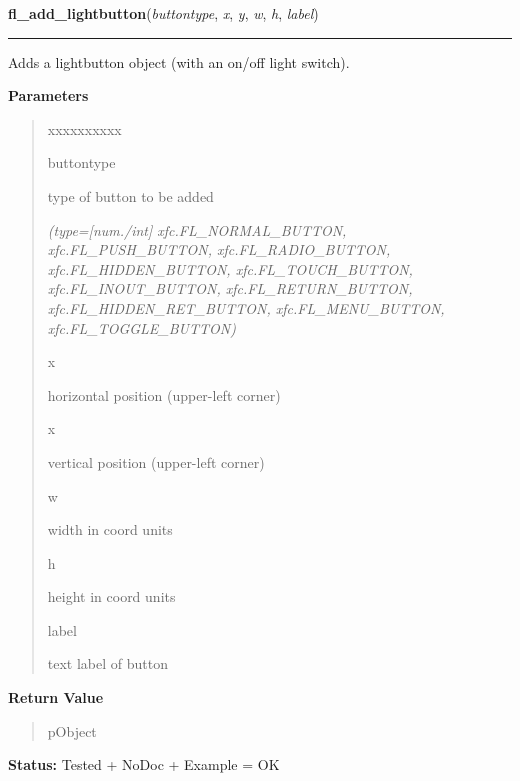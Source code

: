 \hspace{.8\funcindent}\begin{boxedminipage}{\funcwidth}

    \raggedright \textbf{fl\_add\_lightbutton}(\textit{buttontype}, \textit{x}, \textit{y}, \textit{w}, \textit{h}, \textit{label})

    \vspace{-1.5ex}

    \rule{\textwidth}{0.5\fboxrule}
\setlength{\parskip}{2ex}
    Adds a lightbutton object (with an on/off light switch).

\setlength{\parskip}{1ex}
      \textbf{Parameters}
      \vspace{-1ex}

      \begin{quote}
        \begin{Ventry}{xxxxxxxxxx}

          \item[buttontype]

          type of button to be added

            {\it (type=[num./int] xfc.FL\_NORMAL\_BUTTON, xfc.FL\_PUSH\_BUTTON, 
xfc.FL\_RADIO\_BUTTON, xfc.FL\_HIDDEN\_BUTTON, xfc.FL\_TOUCH\_BUTTON, 
xfc.FL\_INOUT\_BUTTON, xfc.FL\_RETURN\_BUTTON, xfc.FL\_HIDDEN\_RET\_BUTTON,
xfc.FL\_MENU\_BUTTON, xfc.FL\_TOGGLE\_BUTTON)}

          \item[x]

          horizontal position (upper-left corner)

          \item[x]

          vertical position (upper-left corner)

          \item[w]

          width in coord units

          \item[h]

          height in coord units

          \item[label]

          text label of button

        \end{Ventry}

      \end{quote}

      \textbf{Return Value}
    \vspace{-1ex}

      \begin{quote}
      pObject

      \end{quote}

\textbf{Status:} Tested + NoDoc + Example = OK



    \end{boxedminipage}

